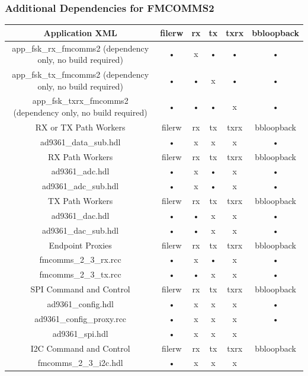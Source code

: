 \subsubsection{Additional Dependencies for FMCOMMS2}
	\begin{tabular}{|c|c|c|c|c|c|}
	\hline
	\rowcolor{blue}
	Application XML & filerw & rx & tx & txrx & bbloopback \\
	\hline
	app\_fsk\_rx\_fmcomms2 (dependency only, no build required) & • & x & • & • & • \\
	\hline
	app\_fsk\_tx\_fmcomms2 (dependency only, no build required) & • & • & x & • & • \\
	\hline
	app\_fsk\_txrx\_fmcomms2 (dependency only, no build required) & • & •  & • & x & • \\
	\hline
	\rowcolor{blue}
	RX or TX Path Workers & filerw & rx & tx & txrx & bbloopback \\
	\hline
	ad9361\_data\_sub.hdl & • & x & x & x & • \\
	\rowcolor{blue}
	RX Path Workers & filerw & rx & tx & txrx & bbloopback \\
	\hline
	ad9361\_adc.hdl & • & x & • & x & • \\
	\hline
	ad9361\_adc\_sub.hdl & • & x & • & x & • \\
	\hline
	\rowcolor{blue}
	TX Path Workers & filerw & rx & tx & txrx & bbloopback \\
	\hline
	ad9361\_dac.hdl & • & • & x & x & • \\
	\hline
	ad9361\_dac\_sub.hdl & • & • & x & x & • \\
	\rowcolor{blue}
	Endpoint Proxies & filerw & rx & tx & txrx & bbloopback \\
	\hline
	fmcomms\_2\_3\_rx.rcc & • & x & • & x & • \\
	\hline
	fmcomms\_2\_3\_tx.rcc & • & • & x & x & • \\
	\hline
	\rowcolor{blue}
	SPI Command and Control & filerw & rx & tx & txrx & bbloopback \\
	\hline
	ad9361\_config.hdl & • & x & x & x & • \\
	\hline
	ad9361\_config\_proxy.rcc & • & x & x & x & •  \\
	\hline
	ad9361\_spi.hdl & • & x & x & x &   \\
	\hline
	\rowcolor{blue}
	I2C Command and Control & filerw & rx & tx & txrx & bbloopback \\
	\hline
	fmcomms\_2\_3\_i2c.hdl & • & x & x & x &   \\
	\hline
	\end{tabular}

